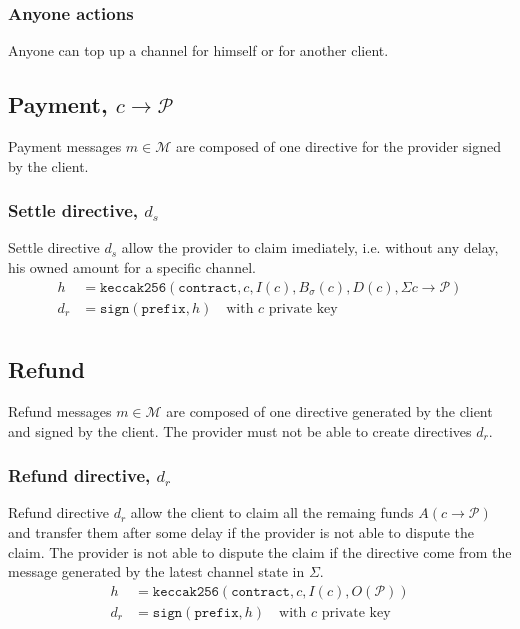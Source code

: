 \documentclass{llncs}
\begin{document}
\subsubsection{Anyone actions} Anyone can top up a channel for himself or for another client.

\subsection{Payment, $c \rightarrow \mathcal{P}$} Payment messages $m \in \mathcal{M}$ are composed of one directive for the provider signed by the client.

\subsubsection{Settle directive, $d_s$} Settle directive $d_s$ allow the provider to claim imediately, i.e. without any delay, his owned amount for a specific channel.
\begin{equation*}
\begin{split}
    h &= \texttt{keccak256}(\texttt{contract},c,I(c),B_\sigma(c),D(c),\textstyle\Sigma c \rightarrow \mathcal{P}) \\
    d_r &= \texttt{sign}(\texttt{prefix}, h) \quad \text{with $c$ private key} \\
\end{split}
\end{equation*}

\subsection{Refund} Refund messages $m \in \mathcal{M}$ are composed of one directive generated by the client and signed by the client. The provider must not be able to create directives $d_r$.

\subsubsection{Refund directive, $d_r$} Refund directive $d_r$ allow the client to claim all the remaing funds $A(c \rightarrow \mathcal{P})$ and transfer them after some delay if the provider is not able to dispute the claim. The provider is not able to dispute the claim if the directive come from the message generated by the latest channel state in $\Sigma$.
\begin{equation*}
\begin{split}
    h &= \texttt{keccak256}(\texttt{contract},c,I(c),O(\mathcal{P})) \\
    d_r &= \texttt{sign}(\texttt{prefix}, h) \quad \text{with $c$ private key} \\
\end{split}
\end{equation*}
\end{document}
